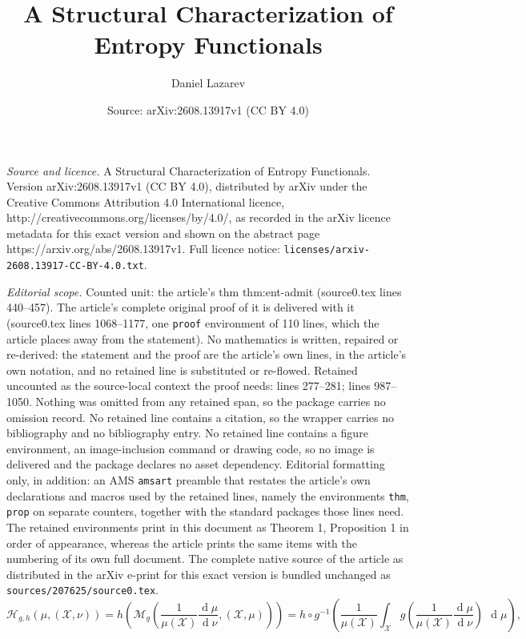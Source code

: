 \documentclass[10pt,a4paper]{amsart}
\title{A Structural Characterization of Entropy Functionals}
\author{Daniel Lazarev}
\date{Source: arXiv:2608.13917v1 (CC BY 4.0)}
\def\dd{{\operatorname{d}}}
\begin{document}
\maketitle

\noindent\emph{Source and licence.} A Structural Characterization of Entropy Functionals. Version arXiv:2608.13917v1 (CC BY 4.0), distributed by arXiv under the Creative Commons Attribution 4.0 International licence, http://creativecommons.org/licenses/by/4.0/, as recorded in the arXiv licence metadata for this exact version and shown on the abstract page https://arxiv.org/abs/2608.13917v1. Full licence notice: \texttt{licenses/arxiv-2608.13917-CC-BY-4.0.txt}.\par\smallskip

\noindent\textit{Editorial scope.} Counted unit: the article's thm thm:ent-admit (source0.tex lines 440--457). The article's complete original proof of it is delivered with it (source0.tex lines 1068--1177, one \texttt{proof} environment of 110 lines, which the article places away from the statement). No mathematics is written, repaired or re-derived: the statement and the proof are the article's own lines, in the article's own notation, and no retained line is substituted or re-flowed.  Retained uncounted as the source-local context the proof needs: lines 277--281; lines 987--1050.  Nothing was omitted from any retained span, so the package carries no omission record.  No retained line contains a citation, so the wrapper carries no bibliography and no bibliography entry.  No retained line contains a figure environment, an image-inclusion command or drawing code, so no image is delivered and the package declares no asset dependency.  Editorial formatting only, in addition: an AMS \texttt{amsart} preamble that restates the article's own declarations and macros used by the retained lines, namely the environments \texttt{thm}, \texttt{prop} on separate counters, together with the standard packages those lines need.  The retained environments print in this document as Theorem 1, Proposition 1 in order of appearance, whereas the article prints the same items with the numbering of its own full document.  The complete native source of the article as distributed in the arXiv e-print for this exact version is bundled unchanged as \texttt{sources/207625/source0.tex}.
\begin{equation}
 \label{eq:gh-entropy}
\mathcal{H}_{g,h}(\mu, (\mathcal{X}, \nu)) =  h \left( \mathcal{M}_g \left(\dfrac{1}{\mu(\mathcal{X}) } \dfrac{\dd \mu}{\dd \nu}, (\mathcal{X}, \mu) \right) \right)  
=   h \circ g^{-1}\left(   \dfrac{1}{\mu(\mathcal{X})} \int_\mathcal{X}  g  \left(\dfrac{1}{\mu(\mathcal{X})}\dfrac{\dd \mu}{\dd \nu} \right) \ \, \dd \mu \right) , 
\end{equation}
\end{document}

